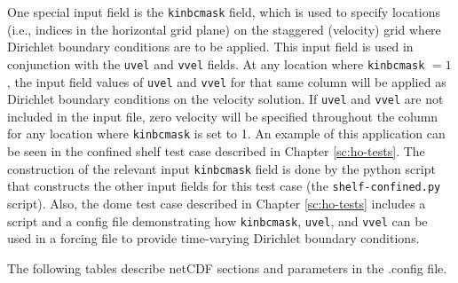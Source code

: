 One special input field is the \texttt{kinbcmask} field, which is used to specify locations (i.e.,
indices in the horizontal grid plane) on the staggered (velocity) grid where Dirichlet boundary 
conditions are to be applied. This input field is used in conjunction with the \texttt{uvel} and 
\texttt{vvel} fields. At any location where \texttt{kinbcmask} $= 1$, the input field
values of \texttt{uvel} and \texttt{vvel} for that same column will be applied as Dirichlet boundary
conditions on the velocity solution. If \texttt{uvel} and \texttt{vvel} are not included in the input file, 
zero velocity will be specified throughout the column for any location where \texttt{kinbcmask} is 
set to 1. An example of this application can be seen in the confined shelf test case described 
in Chapter \ref{sc:ho-tests}. The construction of the relevant input \texttt{kinbcmask} field 
is done by the python script that constructs the other input fields for this test case 
(the \texttt{shelf-confined.py} script).  Also, the dome test case described in 
Chapter \ref{sc:ho-tests} includes a script and a config file demonstrating how 
\texttt{kinbcmask}, \texttt{uvel}, and \texttt{vvel} 
can be used in a forcing file to provide time-varying Dirichlet boundary conditions. 

The following tables describe netCDF sections and parameters in the .config file.

